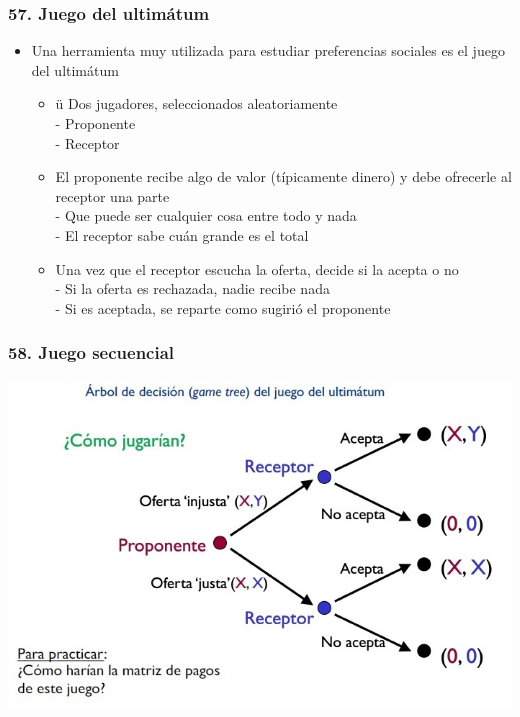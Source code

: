 \documentclass[14pt]{beamer}
\begin{document}
\begin{frame}
\frametitle{57. Juego del ultimátum}
\begin{itemize}
        \item Una herramienta muy utilizada para estudiar preferencias sociales es el juego del ultimátum
        \begin{itemize}
            \item ü Dos jugadores, seleccionados aleatoriamente \\ 
            - Proponente \\
            - Receptor
            \item El proponente recibe algo de valor (típicamente dinero) y debe ofrecerle al receptor una parte \\
            - Que puede ser cualquier cosa entre todo y nada \\
            - El receptor sabe cuán grande es el total
            \item Una vez que el receptor escucha la oferta, decide si la acepta o no \\
            - Si la oferta es rechazada, nadie recibe nada \\
            - Si es aceptada, se reparte como sugirió el proponente
        \end{itemize}
\end{itemize}
\end{frame}

\begin{frame}
\frametitle{58. Juego secuencial}
\centering
\includegraphics[scale=0.6]{Figures/Tema_03_29_arbol.jpg}
\end{frame}
\end{document}

